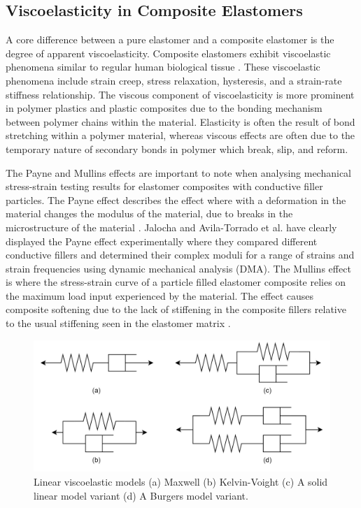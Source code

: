 \subsection{Viscoelasticity in Composite Elastomers}
A core difference between a pure elastomer and a composite elastomer is the degree of apparent viscoelasticity. Composite elastomers exhibit viscoelastic phenomena \cite{Ligia2009} similar to regular human biological tissue \cite{Fung1993}. These viscoelastic phenomena include strain creep, stress relaxation, hysteresis, and a strain-rate stiffness relationship. The viscous component of viscoelasticity is more prominent in polymer plastics and plastic composites due to the bonding mechanism between polymer chains within the material. Elasticity is often the result of bond stretching within a polymer material, whereas  viscous effects are often due to the temporary nature of secondary bonds in polymer which break, slip, and reform. %

The Payne and Mullins effects are important to note when analysing mechanical stress-strain testing results for elastomer composites with conductive filler particles. The Payne effect describes the effect where with a deformation in the material changes the modulus of the material, due to breaks in the microstructure of the material \cite{Payne1972}. Jalocha \cite{Jalocha2020} and Avila-Torrado et al. \cite{AvilaTorrado2022} have clearly displayed the Payne effect experimentally where they compared different conductive fillers and determined their complex moduli for a range of strains and strain frequencies using dynamic mechanical analysis (DMA). The Mullins effect is where the stress-strain curve of a particle filled elastomer composite relies on the maximum load input experienced by the material. The effect causes composite softening due to the lack of stiffening in the composite fillers relative to the usual stiffening seen in the elastomer matrix \cite{Mullins1969}.

\begin{figure}[H]
	\centering
	\includegraphics[width=0.6\linewidth]{Figures/viscoelastic_models.jpg}
	\caption{Linear viscoelastic models (a) Maxwell (b) Kelvin-Voight (c) A solid linear model variant (d) A Burgers model variant.}
	\label{fig:linear_viscoelastic_eg}
\end{figure}

